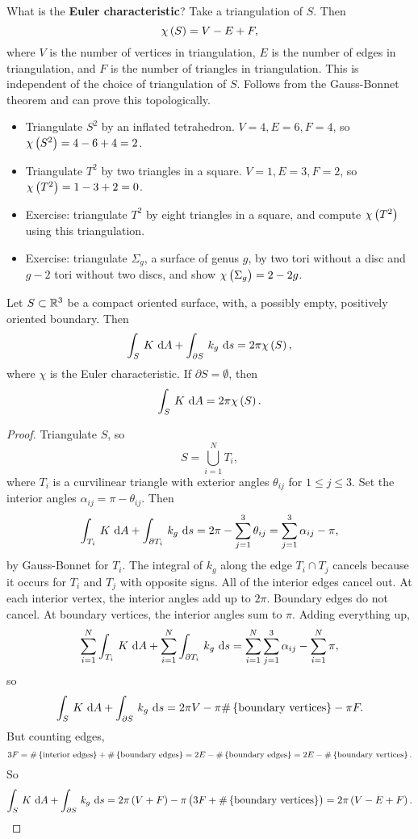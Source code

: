What is the \textbf{Euler characteristic}? Take a triangulation of $ S $. Then
$$ \chi\br{S} = V - E + F, $$
where $ V $ is the number of vertices in triangulation, $ E $ is the number of edges in triangulation, and $ F $ is the number of triangles in triangulation. This is independent of the choice of triangulation of $ S $. Follows from the Gauss-Bonnet theorem and can prove this topologically.

\begin{example*}
\hfill
\begin{itemize}
\item Triangulate $ S^2 $ by an inflated tetrahedron. $ V = 4, E = 6, F = 4 $, so $ \chi\br{S^2} = 4 - 6 + 4 = 2 $.
\item Triangulate $ T^2 $ by two triangles in a square. $ V = 1, E = 3, F = 2 $, so $ \chi\br{T^2} = 1 - 3 + 2 = 0 $.
\item Exercise: triangulate $ T^2 $ by eight triangles in a square, and compute $ \chi\br{T^2} $ using this triangulation.
\item Exercise: triangulate $ \Sigma_g $, a surface of genus $ g $, by two tori without a disc and $ g - 2 $ tori without two discs, and show $ \chi\br{\Sigma_g} = 2 - 2g $.
\end{itemize}
\end{example*}

\pagebreak

\begin{theorem}
Let $ S \subset \mathbb{R}^3 $ be a compact oriented surface, with, a possibly empty, positively oriented boundary. Then
$$ \intd{S}{}{K}{A} + \intd{\partial S}{}{k_g}{s} = 2\pi\chi\br{S}, $$
where $ \chi $ is the Euler characteristic. If $ \partial S = \emptyset $, then
$$ \intd{S}{}{K}{A} = 2\pi\chi\br{S}. $$
\end{theorem}

\begin{proof}
Triangulate $ S $, so
$$ S = \bigcup_{i = 1}^N T_i, $$
where $ T_i $ is a curvilinear triangle with exterior angles $ \theta_{ij} $ for $ 1 \le j \le 3 $. Set the interior angles $ \alpha_{ij} = \pi - \theta_{ij} $. Then
$$ \intd{T_i}{}{K}{A} + \intd{\partial T_i}{}{k_g}{s} = 2\pi - \sum_{j = 1}^3 \theta_{ij} = \sum_{j = 1}^3 \alpha_{ij} - \pi, $$
by Gauss-Bonnet for $ T_i $. The integral of $ k_g $ along the edge $ T_i \cap T_j $ cancels because it occurs for $ T_i $ and $ T_j $ with opposite signs. All of the interior edges cancel out. At each interior vertex, the interior angles add up to $ 2\pi $. Boundary edges do not cancel. At boundary vertices, the interior angles sum to $ \pi $. Adding everything up,
$$ \sum_{i = 1}^N \intd{T_i}{}{K}{A} + \sum_{i = 1}^N \intd{\partial T_i}{}{k_g}{s} = \sum_{i = 1}^N \sum_{j = 1}^3 \alpha_{ij} - \sum_{i = 1}^N \pi, $$
so
$$ \intd{S}{}{K}{A} + \intd{\partial S}{}{k_g}{s} = 2\pi V - \pi\#\cbr{\text{boundary vertices}} - \pi F. $$
But counting edges,
$$ 3F = \#\cbr{\text{interior edges}} + \#\cbr{\text{boundary edges}} = 2E - \#\cbr{\text{boundary edges}} = 2E - \#\cbr{\text{boundary vertices}}. $$
So
$$ \intd{S}{}{K}{A} + \intd{\partial S}{}{k_g}{s} = 2\pi\br{V + F} - \pi\br{3F + \#\cbr{\text{boundary vertices}}} = 2\pi\br{V - E + F}. $$
\end{proof}


